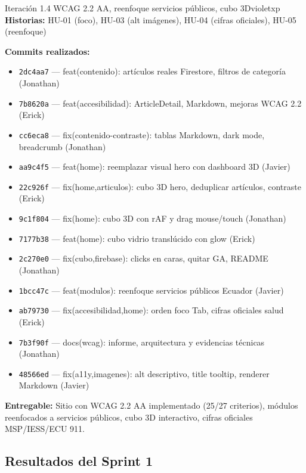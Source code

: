 \documentclass[12pt, a4paper]{article}
\begin{document}
\begin{iterbox}{Iteración 1.4 \quad WCAG 2.2 AA, reenfoque servicios públicos, cubo 3D}{violetxp}
\textbf{Historias:} HU-01 (foco), HU-03 (alt imágenes), HU-04 (cifras oficiales), HU-05 (reenfoque)

\textbf{Commits realizados:}
\begin{itemize}
  \item \texttt{2dc4aa7} --- feat(contenido): artículos reales Firestore, filtros de categoría (Jonathan)
  \item \texttt{7b8620a} --- feat(accesibilidad): ArticleDetail, Markdown, mejoras WCAG 2.2 (Erick)
  \item \texttt{cc6eca8} --- fix(contenido-contraste): tablas Markdown, dark mode, breadcrumb (Jonathan)
  \item \texttt{aa9c4f5} --- feat(home): reemplazar visual hero con dashboard 3D (Javier)
  \item \texttt{22c926f} --- fix(home,articulos): cubo 3D hero, deduplicar artículos, contraste (Erick)
  \item \texttt{9c1f804} --- fix(home): cubo 3D con rAF y drag mouse/touch (Jonathan)
  \item \texttt{7177b38} --- feat(home): cubo vidrio translúcido con glow (Erick)
  \item \texttt{2c270e0} --- fix(cubo,firebase): clicks en caras, quitar GA, README (Jonathan)
  \item \texttt{1bcc47c} --- feat(modulos): reenfoque servicios públicos Ecuador (Javier)
  \item \texttt{ab79730} --- fix(accesibilidad,home): orden foco Tab, cifras oficiales salud (Erick)
  \item \texttt{7b3f90f} --- docs(wcag): informe, arquitectura y evidencias técnicas (Jonathan)
  \item \texttt{48566ed} --- fix(a11y,imagenes): alt descriptivo, title tooltip, renderer Markdown (Javier)
\end{itemize}

\textbf{Entregable:} Sitio con WCAG 2.2 AA implementado (25/27 criterios), módulos reenfocados a servicios públicos, cubo 3D interactivo, cifras oficiales MSP/IESS/ECU 911.
\end{iterbox}

\subsection{Resultados del Sprint 1}
\end{document}
